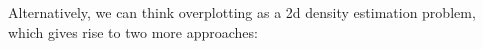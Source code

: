 \begin{itemize}
    
  
\end{itemize}

Alternatively, we can think overplotting as a 2d density estimation problem, which gives rise to two more approaches:
  
